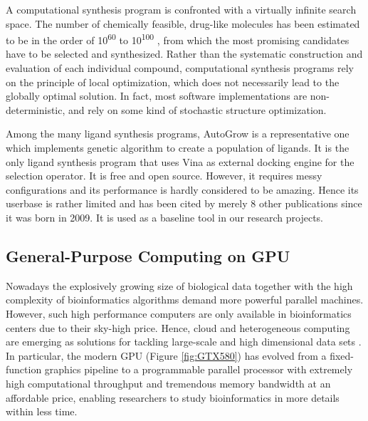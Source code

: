 A computational synthesis program is confronted with a virtually infinite search space. The number of chemically feasible, drug-like molecules has been estimated to be in the order of 10\textsuperscript{60} to 10\textsuperscript{100} \citep{363-2005}, from which the most promising candidates have to be selected and synthesized. Rather than the systematic construction and evaluation of each individual compound, computational synthesis programs rely on the principle of local optimization, which does not necessarily lead to the globally optimal solution. In fact, most software implementations \citep{466-2009,749-2011} are non-deterministic, and rely on some kind of stochastic structure optimization.

Among the many ligand synthesis programs, AutoGrow \citep{466-2009} is a representative one which implements genetic algorithm to create a population of ligands. It is the only ligand synthesis program that uses Vina \citep{595-2010} as external docking engine for the selection operator. It is free and open source. However, it requires messy configurations and its performance is hardly considered to be amazing. Hence its userbase is rather limited and has been cited by merely 8 other publications since it was born in 2009. It is used as a baseline tool in our research projects.

\subsection{General-Purpose Computing on GPU}

Nowadays the explosively growing size of biological data together with the high complexity of bioinformatics algorithms demand more powerful parallel machines. However, such high performance computers are only available in bioinformatics centers due to their sky-high price. Hence, cloud and heterogeneous computing are emerging as solutions for tackling large-scale and high dimensional data sets \citep{269-2010,267-2011,268-2011}. In particular, the modern GPU (Figure \ref{fig:GTX580}) has evolved from a fixed-function graphics pipeline to a programmable parallel processor with extremely high computational throughput and tremendous memory bandwidth at an affordable price, enabling researchers to study bioinformatics in more details within less time.

